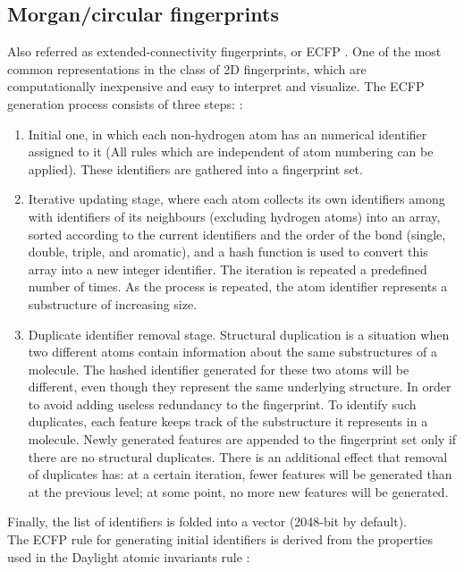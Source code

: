 \subsection{Morgan/circular fingerprints}
Also referred as extended-connectivity fingerprints, or ECFP {\cite{Rogers2010Extended-ConnectivityFingerprints}}.
One of the most common representations in the class of 2D fingerprints, which are computationally inexpensive and easy to interpret and visualize.
The ECFP generation process consists of three steps: {\cite{Rogers2010Extended-ConnectivityFingerprints}}:
\begin{enumerate}
    \item Initial one, in which each non-hydrogen atom has an numerical identifier assigned to it (All rules which are independent of atom numbering can be applied).
    These identifiers are gathered into a fingerprint set. 
    \item Iterative updating stage, where each atom collects its own identifiers among with identifiers of its neighbours (excluding hydrogen atoms) into an array, sorted according to the current identifiers and the order of the bond (single, double, triple, and aromatic), and a hash function is used to convert this array into a new integer identifier.
    The iteration is repeated a predefined number of times. As the process is repeated, the atom identifier represents a
    substructure of increasing size.
    \item Duplicate identifier removal stage. Structural duplication is a situation when two different atoms contain information about the same substructures of a molecule.
    The hashed identifier generated for these two atoms will be different, even though they represent the same underlying structure.
    In order to avoid adding useless redundancy to the fingerprint.
    To identify such duplicates, each feature keeps track of the substructure it represents in a molecule.
    Newly generated features are appended to the fingerprint set only if there are no structural duplicates.
    There is an additional effect that removal of duplicates has: at a certain iteration, fewer features will be generated than at the previous level; at some point, no more new features will be generated.
\end{enumerate}
    Finally, the list of identifiers is folded into a vector (2048-bit by default).
\hfill\break\\
 The ECFP rule for generating initial identifiers is derived from the properties used in the Daylight atomic invariants rule {\cite{Weininger1989SMILES.Notation}}:
